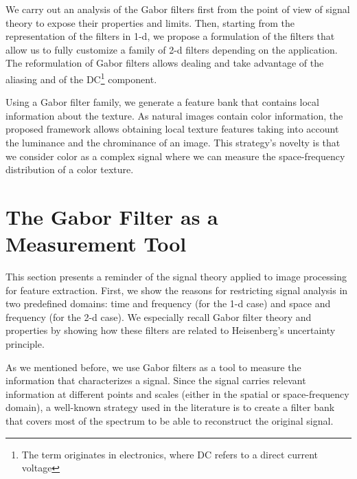 We carry out an analysis of the Gabor filters first from the point of view of signal theory to expose their properties and limits. Then, starting from the representation of the filters in 1-d, we propose a formulation of the filters that allow us to fully customize a family of 2-d filters depending on the application. The reformulation of Gabor filters allows dealing and take advantage of the aliasing and of the DC\footnote{The term originates in electronics, where DC refers to a direct current voltage} component. 

Using a Gabor filter family, we generate a feature bank that contains local information about the texture. As natural images contain color information, the proposed framework allows obtaining local texture features taking into account the luminance and the chrominance of an image. This strategy's novelty is that we consider color as a complex signal where we can measure the space-frequency distribution of a color texture. 

\section{The Gabor Filter as a Measurement Tool}\label{ch:gabor_filter_description}

This section presents a reminder of the signal theory applied to image processing for feature extraction. First, we show the reasons for restricting signal analysis in two predefined domains: time and frequency (for the 1-d case) and space and frequency (for the 2-d case). We especially recall Gabor filter theory and properties by showing how these filters are related to Heisenberg's uncertainty principle.

As we mentioned before, we use Gabor filters as a tool to measure the information that characterizes a signal. Since the signal carries relevant information at different points and scales (either in the spatial or space-frequency domain), a well-known strategy used in the literature is to create a filter bank that covers most of the spectrum to be able to reconstruct the original signal.

